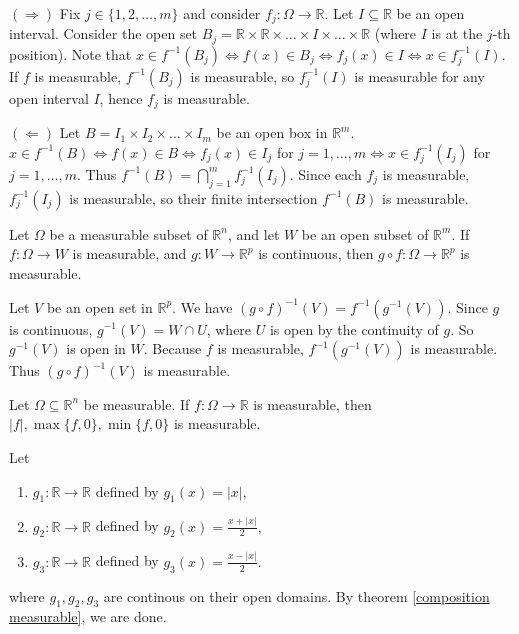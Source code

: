 \begin{pfbox}
    $(\Rightarrow)$ Fix $j \in \{1, 2, \dots, m\}$ and consider $f_j : \Omega \rightarrow \mathbb{R}$. Let $I \subseteq \mathbb{R}$ be an open interval. Consider the open set $B_j = \mathbb{R} \times \mathbb{R} \times \dots \times I \times \dots \times \mathbb{R}$ (where $I$ is at the $j$-th position). Note that $x \in f^{-1}(B_j) \Leftrightarrow f(x) \in B_j \Leftrightarrow f_j(x) \in I \Leftrightarrow x \in f_j^{-1}(I)$. If $f$ is measurable, $f^{-1}(B_j)$ is measurable, so $f_j^{-1}(I)$ is measurable for any open interval $I$, hence $f_j$ is measurable.
    
    $(\Leftarrow)$ Let $B = I_1 \times I_2 \times \dots \times I_m$ be an open box in $\mathbb{R}^m$. $x \in f^{-1}(B) \Leftrightarrow f(x) \in B \Leftrightarrow f_j(x) \in I_j$ for $j=1, \dots, m \Leftrightarrow x \in f_j^{-1}(I_j)$ for $j=1, \dots, m$. Thus $f^{-1}(B) = \bigcap_{j=1}^m f_j^{-1}(I_j)$. Since each $f_j$ is measurable, $f_j^{-1}(I_j)$ is measurable, so their finite intersection $f^{-1}(B)$ is measurable.
\end{pfbox}

\begin{theorem}
    Let $\Omega$ be a measurable subset of $\mathbb{R}^n$, and let $W$ be an open subset of $\mathbb{R}^m$. If $f: \Omega \rightarrow W$ is measurable, and $g: W \rightarrow \mathbb{R}^p$ is continuous, then $g \circ f: \Omega \rightarrow \mathbb{R}^p$ is measurable.
\label{composition measurable}
\end{theorem}

\begin{pfbox}
    Let $V$ be an open set in $\mathbb{R}^p$. We have $(g \circ f)^{-1}(V) = f^{-1}(g^{-1}(V))$. Since $g$ is continuous, $g^{-1}(V) = W \cap U$, where $U$ is open by the continuity of $g$. So $g^{-1}(V)$ is open in $W$. Because $f$ is measurable, $f^{-1}(g^{-1}(V))$ is measurable. Thus $(g \circ f)^{-1}(V)$ is measurable.
\end{pfbox}

\begin{corollary}
    Let $\Omega\subseteq\mathbb{R}^n$ be measurable. If $f:\Omega\to\mathbb{R}$ is measurable,
    then $|f|, \max\{f,0\}, \min\{f,0\}$ is measurable.
\end{corollary}

\begin{pfbox}
    Let \vspace{-1em}
    \begin{enumerate}
        \item $g_1: \mathbb{R}\to\mathbb{R}$ defined by $g_1(x)=|x|,$
        \item $g_2: \mathbb{R}\to\mathbb{R}$ defined by $g_2(x)=\frac{x+|x|}{2},$
        \item $g_3: \mathbb{R}\to\mathbb{R}$ defined by $g_3(x)=\frac{x-|x|}{2}.$
    \end{enumerate}
    where $g_1, g_2, g_3$ are continous on their open domains.
    By theorem \eqref{composition measurable}, we are done.
\end{pfbox}

